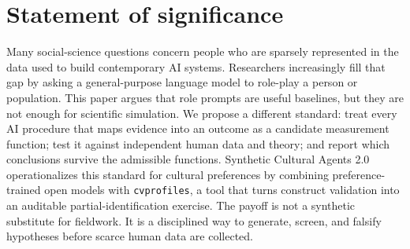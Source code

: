 \documentclass[10pt,letterpaper]{article}
\newcommand{\cvp}{\texttt{cvprofiles}}
\begin{document}
\section*{Statement of significance}
Many social-science questions concern people who are sparsely represented in the data used to build contemporary AI systems. Researchers increasingly fill that gap by asking a general-purpose language model to role-play a person or population. This paper argues that role prompts are useful baselines, but they are not enough for scientific simulation. We propose a different standard: treat every AI procedure that maps evidence into an outcome as a candidate measurement function; test it against independent human data and theory; and report which conclusions survive the admissible functions. Synthetic Cultural Agents 2.0 operationalizes this standard for cultural preferences by combining preference-trained open models with \cvp{}, a tool that turns construct validation into an auditable partial-identification exercise. The payoff is not a synthetic substitute for fieldwork. It is a disciplined way to generate, screen, and falsify hypotheses before scarce human data are collected.
\end{document}
